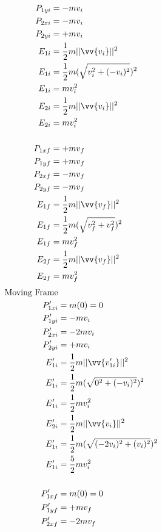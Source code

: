 \documentclass[11pt,letterpaper, twocolumn]{article}
\begin{document}
\begin{enumerate}[label=(\alph*)]
\begin{align*}
        P_{1yi} &= -mv_i\\
        P_{2xi} &= -mv_i\\
        P_{2yi} &= +mv_i\\
        E_{1i} &= \frac{1}{2}m||\vv{v_i}||^2\\
        E_{1i} &= \frac{1}{2}m(\sqrt{v_{i}^2 + (-v_{i})^2})^2\\
        E_{1i} &= mv_{i}^2\\
        E_{2i} &= \frac{1}{2}m||\vv{v_i}||^2\\
        E_{2i} &= mv_{i}^2\\\\
        P_{1xf} &= +mv_f\\
        P_{1yf} &= +mv_f\\
        P_{2xf} &= -mv_f\\
        P_{2yf} &= -mv_f\\
        E_{1f} &= \frac{1}{2}m||\vv{v_f}||^2\\
        E_{1f} &= \frac{1}{2}m(\sqrt{v_{f}^2 + v_{f}^2})^2\\
        E_{1f} &= mv_{f}^2\\
        E_{2f} &= \frac{1}{2}m||\vv{v_f}||^2\\
        E_{2f} &= mv_{f}^2\\
    \end{align*}
    \begin{align*}
        \text{Moving Frame}\\
        P_{1xi}' &= m(0) = 0\\
        P_{1yi}' &= -mv_i\\
        P_{2xi}' &= -2mv_i\\
        P_{2yi}' &= +mv_i\\
        E_{1i}' &= \frac{1}{2}m||\vv{v_{1i}'}||^2\\
        E_{1i}' &= \frac{1}{2}m(\sqrt{0^2 + (-v_{i})^2})^2\\
        E_{1i}' &= \frac{1}{2}mv_{i}^2\\
        E_{2i}' &= \frac{1}{2}m||\vv{v_i}||^2\\
        E_{1i}' &= \frac{1}{2}m(\sqrt{(-2v_i)^2 + (v_{i})^2})^2\\
        E_{1i}' &= \frac{5}{2}mv_{i}^2\\\\
        P_{1xf}' &= m(0) = 0\\
        P_{1yf}' &= +mv_f\\
        P_{2xf}' &= -2mv_f\\

\end{align*}
\end{enumerate}
\end{document}

